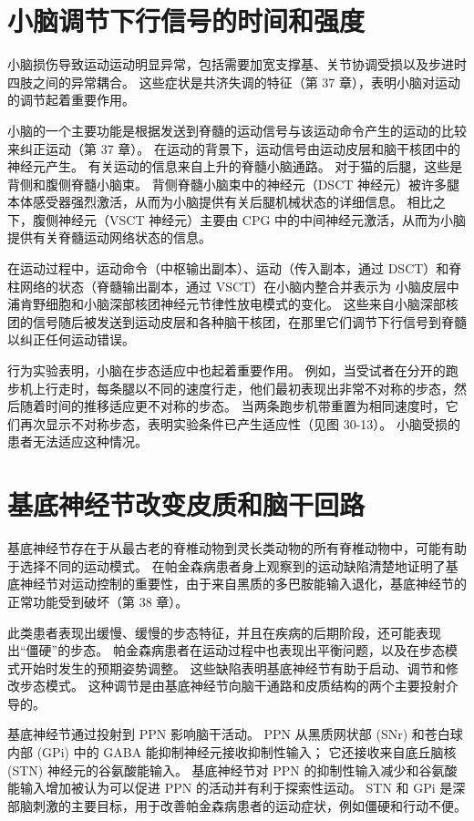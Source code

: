 \section{小脑调节下行信号的时间和强度}

小脑损伤导致运动运动明显异常，包括需要加宽支撑基、关节协调受损以及步进时四肢之间的异常耦合。 这些症状是共济失调的特征（第 37 章），表明小脑对运动的调节起着重要作用。

小脑的一个主要功能是根据发送到脊髓的运动信号与该运动命令产生的运动的比较来纠正运动（第 37 章）。 在运动的背景下，运动信号由运动皮层和脑干核团中的神经元产生。 有关运动的信息来自上升的脊髓小脑通路。 对于猫的后腿，这些是背侧和腹侧脊髓小脑束。 背侧脊髓小脑束中的神经元（DSCT 神经元）被许多腿本体感受器强烈激活，从而为小脑提供有关后腿机械状态的详细信息。 相比之下，腹侧神经元（VSCT 神经元）主要由 CPG 中的中间神经元激活，从而为小脑提供有关脊髓运动网络状态的信息。

在运动过程中，运动命令（中枢输出副本）、运动（传入副本，通过 DSCT）和脊柱网络的状态（脊髓输出副本，通过 VSCT）在小脑内整合并表示为 小脑皮层中浦肯野细胞和小脑深部核团神经元节律性放电模式的变化。 这些来自小脑深部核团的信号随后被发送到运动皮层和各种脑干核团，在那里它们调节下行信号到脊髓以纠正任何运动错误。

行为实验表明，小脑在步态适应中也起着重要作用。 例如，当受试者在分开的跑步机上行走时，每条腿以不同的速度行走，他们最初表现出非常不对称的步态，然后随着时间的推移适应更不对称的步态。 当两条跑步机带重置为相同速度时，它们再次显示不对称步态，表明实验条件已产生适应性（见图 30-13）。 小脑受损的患者无法适应这种情况。

\section{基底神经节改变皮质和脑干回路}
基底神经节存在于从最古老的脊椎动物到灵长类动物的所有脊椎动物中，可能有助于选择不同的运动模式。 在帕金森病患者身上观察到的运动缺陷清楚地证明了基底神经节对运动控制的重要性，由于来自黑质的多巴胺能输入退化，基底神经节的正常功能受到破坏（第 38 章）。

此类患者表现出缓慢、缓慢的步态特征，并且在疾病的后期阶段，还可能表现出“僵硬”的步态。 帕金森病患者在运动过程中也表现出平衡问题，以及在步态模式开始时发生的预期姿势调整。 这些缺陷表明基底神经节有助于启动、调节和修改步态模式。 这种调节是由基底神经节向脑干通路和皮质结构的两个主要投射介导的。

基底神经节通过投射到 PPN 影响脑干活动。 PPN 从黑质网状部 (SNr) 和苍白球内部 (GPi) 中的 GABA 能抑制神经元接收抑制性输入； 它还接收来自底丘脑核 (STN) 神经元的谷氨酸能输入。 基底神经节对 PPN 的抑制性输入减少和谷氨酸能输入增加被认为可以促进 PPN 的活动并有利于探索性运动。 STN 和 GPi 是深部脑刺激的主要目标，用于改善帕金森病患者的运动症状，例如僵硬和行动不便。

